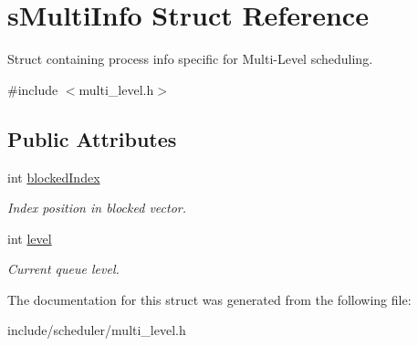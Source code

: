 \hypertarget{structsMultiInfo}{\section{s\-Multi\-Info \-Struct \-Reference}
\label{d0/d35/structsMultiInfo}
}


\-Struct containing process info specific for \-Multi-\/\-Level scheduling.  




{\ttfamily \#include $<$multi\-\_\-level.\-h$>$}

\subsection*{\-Public \-Attributes}
\begin{DoxyCompactItemize}
\item 
\hypertarget{structsMultiInfo_a1db4ae1ae8cca3cc18b5e8f6191ffc42}{int \hyperlink{structsMultiInfo_a1db4ae1ae8cca3cc18b5e8f6191ffc42}{blocked\-Index}}\label{d0/d35/structsMultiInfo_a1db4ae1ae8cca3cc18b5e8f6191ffc42}

\begin{DoxyCompactList}\small\item\em \-Index position in blocked vector. \end{DoxyCompactList}\item 
\hypertarget{structsMultiInfo_af5d9ed72bdc95505eed8a11bfd7297fc}{int \hyperlink{structsMultiInfo_af5d9ed72bdc95505eed8a11bfd7297fc}{level}}\label{d0/d35/structsMultiInfo_af5d9ed72bdc95505eed8a11bfd7297fc}

\begin{DoxyCompactList}\small\item\em \-Current queue level. \end{DoxyCompactList}\end{DoxyCompactItemize}


\-The documentation for this struct was generated from the following file\-:\begin{DoxyCompactItemize}
\item 
include/scheduler/multi\-\_\-level.\-h\end{DoxyCompactItemize}
